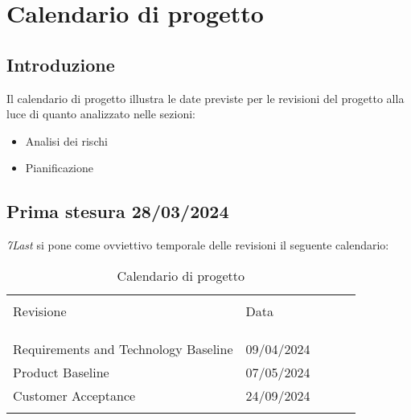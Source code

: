 \section{Calendario di progetto}
\subsection{Introduzione}
Il calendario di progetto illustra le date previste per le revisioni del progetto alla luce di quanto analizzato nelle sezioni:
\begin{itemize}
    \item Analisi dei rischi  
    \item Pianificazione
\end{itemize}

\subsection{Prima stesura 28/03/2024}
\textit{7Last} si pone come ovviettivo temporale delle revisioni il seguente calendario:
\begin{table}[!h]

    \begin{center}
        \begin{tabular}{ l l l l p{9cm} }
            \hline                                                                                                          \\[-2ex]
            Revisione & Data\\
            \\[-2ex] \hline \\[-1.5ex]                                                                                      \\
            Requirements and Technology Baseline & 09/04/2024 \\
            Product Baseline & 07/05/2024 \\
            Customer Acceptance & 24/09/2024 \\
            \\[-1.5ex] \hline
        \end{tabular}
    \end{center}
    \caption{Calendario di progetto}

\end{table}
\newpage
